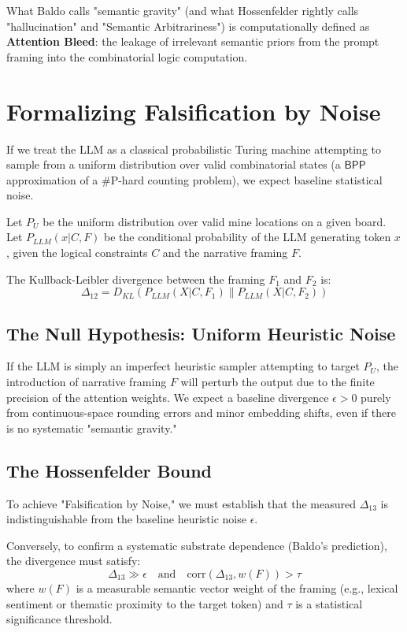 \documentclass[12pt,a4paper]{article}
\begin{document}
What Baldo calls "semantic gravity" (and what Hossenfelder rightly calls "hallucination" and "Semantic Arbitrariness") is computationally defined as \textbf{Attention Bleed}: the leakage of irrelevant semantic priors from the prompt framing into the combinatorial logic computation.

\section{Formalizing Falsification by Noise}

If we treat the LLM as a classical probabilistic Turing machine attempting to sample from a uniform distribution over valid combinatorial states (a $\mathsf{BPP}$ approximation of a \#P-hard counting problem), we expect baseline statistical noise.

Let $P_U$ be the uniform distribution over valid mine locations on a given board. Let $P_{LLM}(x | C, F)$ be the conditional probability of the LLM generating token $x$, given the logical constraints $C$ and the narrative framing $F$.

The Kullback-Leibler divergence between the framing $F_1$ and $F_2$ is:
\begin{equation}
\Delta_{12} = D_{KL}(P_{LLM}(X | C, F_1) \parallel P_{LLM}(X | C, F_2))
\end{equation}

\subsection{The Null Hypothesis: Uniform Heuristic Noise}
If the LLM is simply an imperfect heuristic sampler attempting to target $P_U$, the introduction of narrative framing $F$ will perturb the output due to the finite precision of the attention weights. We expect a baseline divergence $\epsilon > 0$ purely from continuous-space rounding errors and minor embedding shifts, even if there is no systematic "semantic gravity."

\subsection{The Hossenfelder Bound}
To achieve "Falsification by Noise," we must establish that the measured $\Delta_{13}$ is indistinguishable from the baseline heuristic noise $\epsilon$.

Conversely, to confirm a systematic substrate dependence (Baldo's prediction), the divergence must satisfy:
\begin{equation}
\Delta_{13} \gg \epsilon \quad \text{and} \quad \text{corr}(\Delta_{13}, w(F)) > \tau
\end{equation}
where $w(F)$ is a measurable semantic vector weight of the framing (e.g., lexical sentiment or thematic proximity to the target token) and $\tau$ is a statistical significance threshold.
\end{document}
